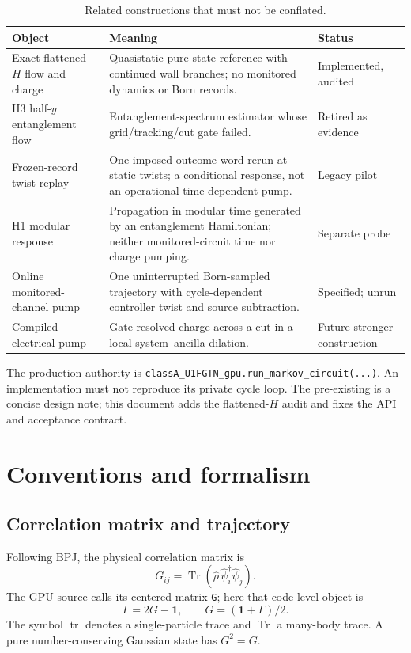 \documentclass[aps,prb,onecolumn,nofootinbib,superscriptaddress]{revtex4-2}
\newcommand{\tr}{\operatorname{tr}}
\newcommand{\Tr}{\operatorname{Tr}}
\newcommand{\Geng}{\Gamma}
\newcommand{\code}[1]{\texttt{#1}}
\begin{document}
\begin{table}[b]
\caption{Related constructions that must not be conflated.}
\label{tab:status}
\begin{tabularx}{\textwidth}{@{}L{0.25\textwidth}Y L{0.16\textwidth}@{}}
\toprule
Object & Meaning & Status \\
\midrule
Exact flattened-$H$ flow and charge
& Quasistatic pure-state reference with continued wall branches; no monitored
dynamics or Born records. & Implemented, audited \\
H3 half-$y$ entanglement flow
& Entanglement-spectrum estimator whose grid/tracking/cut gate failed. &
Retired as evidence \\
Frozen-record twist replay
& One imposed outcome word rerun at static twists; a conditional response, not
an operational time-dependent pump. & Legacy pilot \\
H1 modular response
& Propagation in modular time generated by an entanglement Hamiltonian; neither
monitored-circuit time nor charge pumping. & Separate probe \\
Online monitored-channel pump
& One uninterrupted Born-sampled trajectory with cycle-dependent controller
twist and source subtraction. & Specified; unrun \\
Compiled electrical pump
& Gate-resolved charge across a cut in a local system--ancilla dilation. &
Future stronger construction \\
\bottomrule
\end{tabularx}
\end{table}

The production authority is
\code{classA\_U1FGTN\_gpu.run\_markov\_circuit(...)}.  An implementation must
not reproduce its private cycle loop.  The pre-existing
 is a concise design note; this
document adds the flattened-$H$ audit and fixes the API and acceptance contract.

\section{Conventions and formalism}
\label{sec:formalism}

\subsection{Correlation matrix and trajectory}

Following BPJ, the physical correlation matrix is
\begin{equation}
  G_{ij}=\Tr(\hat\rho\,\hat\psi_i^\dagger\hat\psi_j).
  \label{eq:G}
\end{equation}
The GPU source calls its centered matrix \code{G}; here that code-level object
is
\begin{equation}
  \Geng=2G-\mathbf{1},\qquad G=(\mathbf{1}+\Geng)/2.
  \label{eq:centered}
\end{equation}
The symbol $\tr$ denotes a single-particle trace and $\Tr$ a many-body trace.
A pure number-conserving Gaussian state has $G^2=G$.
\end{document}
